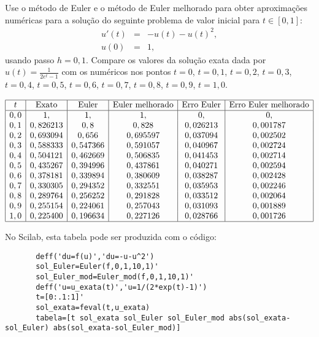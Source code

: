 \begin{exer}
Use o método de Euler e o método de Euler melhorado para obter aproximações numéricas para a solução do seguinte problema de valor inicial para $t\in[0,1]$:
\begin{eqnarray*}
 u'(t)&=&-u(t)- u(t)^2,\\
 u(0)&=&1,
\end{eqnarray*}
usando passo $h=0,1$. Compare os valores da solução exata dada por $u(t)=\frac{1}{2e^t-1}$ com os numéricos nos pontos $t=0$, $t=0,1$, $t=0,2$, $t=0,3$, $t=0,4$, $t=0,5$, $t=0,6$, $t=0,7$, $t=0,8$, $t=0,9$, $t=1,0$.
\end{exer}
\begin{resp}
 $$\begin{array}{|c|c|c|c|c|c|}
\hline
t &  \text{Exato} & \text{Euler} & \text{Euler melhorado} & \text{Erro Euler} & \text{Erro Euler melhorado}\\
\hline
0,0&    1,          &1,          &1,          &0,          &0,       \\
0,1&    0,826213    &0,8         &0,828       &0,026213    &0,001787\\
0,2&    0,693094    &0,656       &0,695597    &0,037094    &0,002502  \\
0,3&    0,588333    &0,547366    &0,591057    &0,040967    &0,002724  \\
0,4&    0,504121    &0,462669    &0,506835    &0,041453    &0,002714  \\
0,5&    0,435267    &0,394996    &0,437861    &0,040271    &0,002594  \\
0,6&    0,378181    &0,339894    &0,380609    &0,038287    &0,002428  \\
0,7&    0,330305    &0,294352    &0,332551    &0,035953    &0,002246  \\
0,8&    0,289764    &0,256252    &0,291828    &0,033512    &0,002064  \\
0,9&    0,255154    &0,224061    &0,257043    &0,031093    &0,001889  \\
1,0&    0,225400    &0,196634    &0,227126    &0,028766    &0,001726\\

\hline
\end{array}
$$

\ifisscilab
      No Scilab, esta tabela pode ser produzida com o código:
      \begin{verbatim}
       deff('du=f(u)','du=-u-u^2')
       sol_Euler=Euler(f,0,1,10,1)'
       sol_Euler_mod=Euler_mod(f,0,1,10,1)'
       deff('u=u_exata(t)','u=1/(2*exp(t)-1)')
       t=[0:.1:1]'
       sol_exata=feval(t,u_exata)
       tabela=[t sol_exata sol_Euler sol_Euler_mod abs(sol_exata-sol_Euler) abs(sol_exata-sol_Euler_mod)]
      \end{verbatim}

    \fi
\end{resp}



